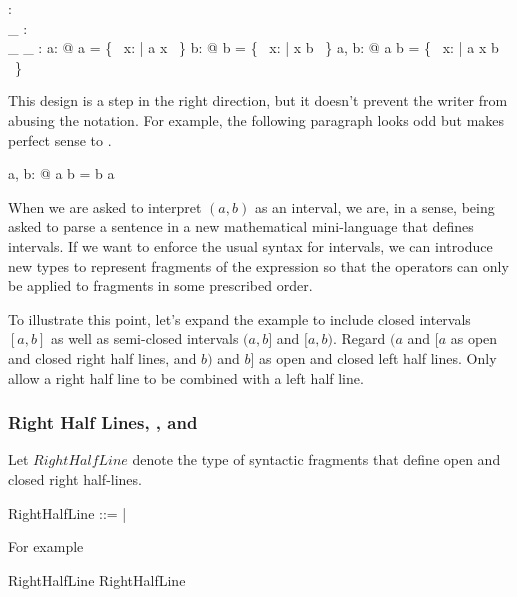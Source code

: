 \documentclass[11pt, oneside]{article}
\begin{document}
\begin{axdef}
	\lowerBound: \R \fun \power \R \\
	\_ \upperBound: \R \fun \power \R \\
	\_ \intersect \_ : \power \R \cross \power \R \fun \power \R
\where
	\forall a: \R @ \lowerBound a = \{~ x: \R | a \ltR x ~\}
\also
	\forall b: \R @ b \upperBound = \{~ x: \R | x \ltR b ~\}
\also
	\forall a, b: \R @ \lowerBound a \intersect b \upperBound = \{~ x: \R | a \ltR x \ltR b ~\}
\end{axdef}

This design is a step in the right direction, but it doesn't prevent the writer from abusing the notation.
For example, the following paragraph looks odd but makes perfect sense to \fuzz.

\begin{zed}
	\forall a, b: \R @ \lowerBound a \intersect b \upperBound = b \upperBound \intersect \lowerBound a 
\end{zed}

When we are asked to interpret $(a,b)$ as an interval, we are, in a sense, being asked to parse a sentence
in a new mathematical mini-language that defines intervals.
If we want to enforce the usual syntax for intervals,
we can introduce new types to represent fragments of the expression so that the operators can only be applied to
fragments in some prescribed order.

To illustrate this point, let's expand the example to include closed intervals $[a,b]$ as well as semi-closed intervals
$(a,b]$ and $[a,b)$.
Regard $(a$ and $[a$ as open and closed right half lines, and $b)$ and $b]$ as open and closed left half lines.
Only allow a right half line to be combined with a left half line.

\subsubsection{Right Half Lines, , and }

Let $RightHalfLine$ denote the type of syntactic fragments that define open and closed right half-lines.

\begin{zed}
	RightHalfLine ::= \openLowerBound \ldata \R \rdata | \closedLowerBound \ldata \R \rdata
\end{zed}

For example

\begin{zed}
	\openLowerBound \zeroR \in RightHalfLine
\also
	\closedLowerBound \oneR \in RightHalfLine
\end{zed}
\end{document}
